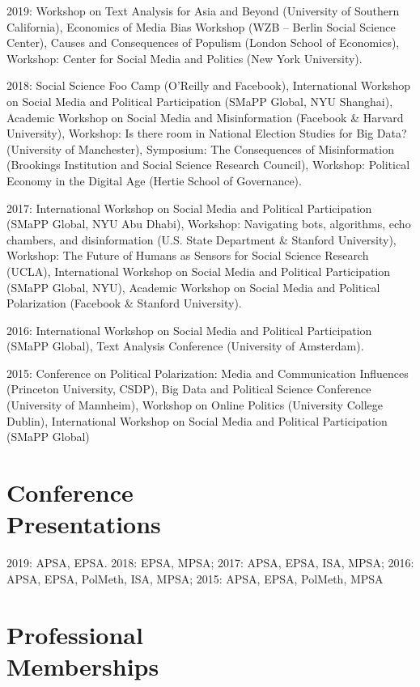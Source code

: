 \documentclass[margin,line,11pt]{resume}
\begin{document}
\begin{resume}
2019: Workshop on Text Analysis for Asia and Beyond (University of Southern California), Economics of Media Bias Workshop (WZB -- Berlin Social Science Center), Causes and Consequences of Populism (London School of Economics), Workshop: Center for Social Media and Politics (New York University).
    
      
2018: Social Science Foo Camp (O'Reilly and Facebook), International Workshop on Social Media and Political Participation (SMaPP Global, NYU Shanghai), Academic Workshop on Social Media and Misinformation (Facebook \& Harvard University), Workshop: Is there room in National Election Studies for Big Data? (University of Manchester), Symposium: The Consequences of Misinformation (Brookings Institution and Social Science Research Council), Workshop: Political Economy in the Digital Age (Hertie School of Governance).



2017: International Workshop on Social Media and Political Participation (SMaPP Global, NYU Abu Dhabi), Workshop: Navigating bots, algorithms, echo chambers, and disinformation (U.S. State Department \& Stanford University), Workshop: The Future of Humans as Sensors for Social Science Research (UCLA),  International Workshop on Social Media and Political Participation (SMaPP Global, NYU), Academic Workshop on Social Media and Political Polarization (Facebook \& Stanford University).

2016: International Workshop on Social Media and Political Participation (SMaPP Global), Text Analysis Conference (University of Amsterdam).

2015: Conference on Political Polarization: Media and Communication Influences (Princeton University, CSDP), Big Data and Political Science Conference (University of Mannheim), Workshop on Online Politics (University College Dublin), International Workshop on Social Media and Political Participation (SMaPP Global)

        \section{\mysidestyle Conference\\Presentations}
        
2019: APSA, EPSA. 2018: EPSA, MPSA; 2017: APSA, EPSA, ISA, MPSA; 2016: APSA, EPSA, PolMeth, ISA, MPSA; 2015: APSA, EPSA, PolMeth, MPSA


\section{\mysidestyle Professional\\Memberships}


\end{resume}
\end{document}
